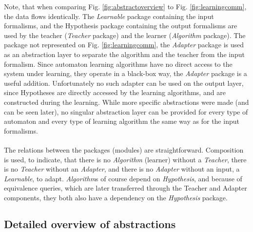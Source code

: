 Note, that when comparing Fig. \ref{fig:abstractoverview} to Fig. \ref{fig:learningcomm}, the data flows identically. The \emph{Learnable} package containing the input formalisms, and the Hypothesis package containing the output formalisms are used by the teacher (\emph{Teacher} package) and the learner (\emph{Algorithm} package). The package not represented on Fig. \ref{fig:learningcomm}, the \emph{Adapter} package is used as an abstraction layer to separate the algorithm and the teacher from the input formalism. Since automaton learning algorithms have no direct access to the system under learning, they operate in a black-box way, the \emph{Adapter} package is a useful addition. Unfortunately no such adapter can be used on the output layer, since Hypotheses are directly accessed by the learning algorithms, and are constructed during the learning. While more specific abstractions were made (and can be seen later), no singular abstraction layer can be provided for every type of automaton and every type of learning algorithm the same way as for the input formalisms.
\\\\
The relations between the packages (modules) are straightforward. Composition is used, to indicate, that there is no \emph{Algorithm} (learner) without a \emph{Teacher}, there is no \emph{Teacher} without an \emph{Adapter}, and there is no \emph{Adapter} without an input, a \emph{Learnable}, to adapt. \emph{Algorithm}s of course depend on \emph{Hypothesis}, and because of equivalence queries, which are later transferred through the Teacher and Adapter components, they both also have a dependency on the \emph{Hypothesis} package.

\subsection{Detailed overview of abstractions}


